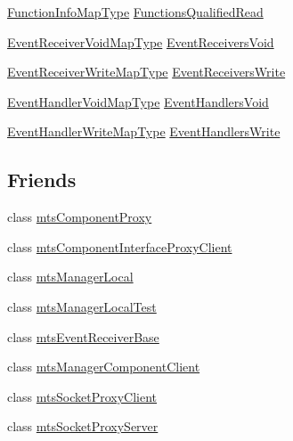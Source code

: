 \begin{DoxyCompactItemize}
\item 
\hyperlink{classmts_interface_required_a4c21eaf53811c5782bae6293904cffe5}{Function\-Info\-Map\-Type} \hyperlink{classmts_interface_required_abd2e0b70299b9a9a51cb7f3443d1364b}{Functions\-Qualified\-Read}
\item 
\hyperlink{classmts_interface_required_a4f0c15e3c51f635a969eb8706a55afb1}{Event\-Receiver\-Void\-Map\-Type} \hyperlink{classmts_interface_required_a88fa763c4f674eb5fdb5347e11532b4b}{Event\-Receivers\-Void}
\item 
\hyperlink{classmts_interface_required_a58a4a6a94697fbb23d2884cf6cbf2a0b}{Event\-Receiver\-Write\-Map\-Type} \hyperlink{classmts_interface_required_af63cf75357e16f0e1ae862d9abaadbe3}{Event\-Receivers\-Write}
\item 
\hyperlink{classmts_interface_required_a1f6cca73d8dffb794e3778092b375783}{Event\-Handler\-Void\-Map\-Type} \hyperlink{classmts_interface_required_a8bec1e9d553dbadde976ec4aee9d9dd0}{Event\-Handlers\-Void}
\item 
\hyperlink{classmts_interface_required_a8ea82ecaf05dc0aca4595ac685b8a43f}{Event\-Handler\-Write\-Map\-Type} \hyperlink{classmts_interface_required_a41c48795f94e27b82a6ace96a194f602}{Event\-Handlers\-Write}
\end{DoxyCompactItemize}
\subsection*{Friends}
\begin{DoxyCompactItemize}
\item 
class \hyperlink{classmts_interface_required_a744ae66bbeeeba6ef38e59a2dd5e9743}{mts\-Component\-Proxy}
\item 
class \hyperlink{classmts_interface_required_a18fd56a8a436d449d0b4cfd44835f821}{mts\-Component\-Interface\-Proxy\-Client}
\item 
class \hyperlink{classmts_interface_required_a31c1c611dbb103ac58ed40d84960baa0}{mts\-Manager\-Local}
\item 
class \hyperlink{classmts_interface_required_adc2ae8db48d5418c526f275aafa3d4a9}{mts\-Manager\-Local\-Test}
\item 
class \hyperlink{classmts_interface_required_a30ab6f7454e493cfaa5fe89319934c6a}{mts\-Event\-Receiver\-Base}
\item 
class \hyperlink{classmts_interface_required_abdd48306351388730b5025e062ae1069}{mts\-Manager\-Component\-Client}
\item 
class \hyperlink{classmts_interface_required_a29fb04198d83763f1d10ca5e03f2fa2f}{mts\-Socket\-Proxy\-Client}
\item 
class \hyperlink{classmts_interface_required_add2bf103c2ba9373d7a6cacccfe1046d}{mts\-Socket\-Proxy\-Server}
\end{DoxyCompactItemize}


